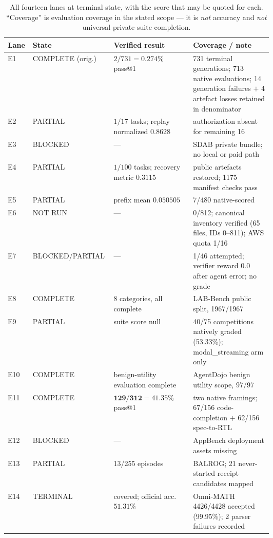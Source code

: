 \begin{table}[h]
  \centering
  \caption{All fourteen lanes at terminal state, with the score that may be
  quoted for each. ``Coverage'' is evaluation coverage in the stated scope --- it
  is \emph{not} accuracy and \emph{not} universal private-suite completion.}
  \label{tab:lanes}
  \footnotesize
  \begin{tabular}{@{}llL{0.30\linewidth}L{0.30\linewidth}@{}}
    \toprule
    \textbf{Lane} & \textbf{State} & \textbf{Verified result} & \textbf{Coverage / note} \\
    \midrule
    E1 & COMPLETE (orig.) & $2/731 = 0.274\%$ pass@1 & 731 terminal generations; 713 native evaluations; 14 generation failures $+$ 4 artefact losses retained in denominator \\
    E2 & PARTIAL & $1/17$ tasks; replay normalized $0.8628$ & authorization absent for remaining 16 \\
    E3 & BLOCKED & --- & SDAB private bundle; no local or paid path \\
    E4 & PARTIAL & $1/100$ tasks; recovery metric $0.3115$ & public artefacts restored; 1175 manifest checks pass \\
    E5 & PARTIAL & prefix mean $0.050505$ & 7/480 native-scored \\
    E6 & NOT RUN & --- & 0/812; canonical inventory verified (65 files, IDs 0--811); AWS quota 1/16 \\
    E7 & BLOCKED/PARTIAL & --- & 1/46 attempted; verifier reward $0.0$ after agent error; no grade \\
    E8 & COMPLETE & 8 categories, all complete & LAB-Bench public split, 1967/1967 \\
    E9 & PARTIAL & suite score null & 40/75 competitions natively graded (53.33\%); modal\_streaming arm only \\
    E10 & COMPLETE & benign-utility evaluation complete & AgentDojo benign utility scope, 97/97 \\
    E11 & COMPLETE & $\mathbf{129/312 = 41.35\%}$ pass@1 & two native framings; 67/156 code-completion $+$ 62/156 spec-to-RTL \\
    E12 & BLOCKED & --- & AppBench deployment assets missing \\
    E13 & PARTIAL & 13/255 episodes & BALROG; 21 never-started receipt candidates mapped \\
    E14 & TERMINAL & covered; official acc.\ $\mathbf{51.31\%}$ & Omni-MATH 4426/4428 accepted (99.95\%); 2 parser failures recorded \\
    \bottomrule
  \end{tabular}
\end{table}

